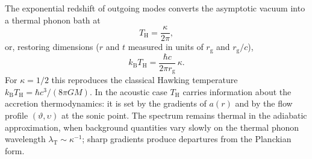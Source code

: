 \documentclass[12pt,a4paper,preprint]{elsarticle}
\begin{document}
            The exponential redshift of outgoing modes converts the asymptotic vacuum into a thermal phonon bath at
            \begin{equation}
                T_{\mathrm{H}} = \frac{\kappa}{2\pi} ,
                \label{eq:hawking-temperature}
            \end{equation}
            or, restoring dimensions ($r$ and $t$ measured in units of $r_{\mathrm{g}}$ and $r_{\mathrm{g}}/c$),
            \begin{equation}
                k_{\mathrm{B}}T_{\mathrm{H}} = \frac{\hbar c}{2\pi r_{\mathrm{g}}}\,\kappa .
                \label{eq:hawking-temperature-dim}
            \end{equation}
            For $\kappa=1/2$ this reproduces the classical Hawking temperature $k_{\mathrm{B}}T_{\mathrm{H}}=\hbar c^{3}/(8\pi GM)$. In the acoustic case $T_{\mathrm{H}}$ carries information about the accretion thermodynamics: it is set by the gradients of $a(r)$ and by the flow profile $(\vartheta,\upsilon)$ at the sonic point. The spectrum remains thermal in the adiabatic approximation, when background quantities vary slowly on the thermal phonon wavelength $\lambda_{\mathrm{T}}\sim\kappa^{-1}$; sharp gradients produce departures from the Planckian form.
\end{document}
